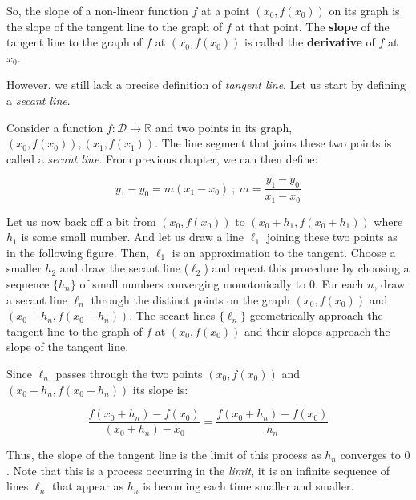 \documentclass[11pt]{article}
\theoremstyle{definition}
\theoremstyle{plain}
\begin{document}
    So, the slope of a non-linear function \(f\) at a point
\(\left(x_0,f(x_0)\right)\) on its graph is the slope of the tangent
line to the graph of \(f\) at that point. The \textbf{slope} of the
tangent line to the graph of \(f\) at \(\left(x_0,f(x_0)\right)\) is
called the \textbf{derivative} of \(f\) at \(x_0\).

However, we still lack a precise definition of \emph{tangent line}. Let
us start by defining a \emph{secant line}.

Consider a function \(f : \mathcal{D}\rightarrow\mathbb{R}\) and two
points in its graph,
\(\left(x_0, f(x_0)\right),\left(x_1, f(x_1)\right)\). The line segment
that joins these two points is called a \emph{secant line}. From
previous chapter, we can then define:

\[
y_1 - y_0 = m(x_1 - x_0) \ ; \  m = \frac{y_1 - y_0}{x_1 - x_0}
\]

Let us now back off a bit from \(\left(x_0, f(x_0)\right)\) to
\(\left(x_0+h_1, f(x_0+h_1)\right)\) where \(h_1\) is some small number.
And let us draw a line \(\ell_1\) joining these two points as in the
following figure. Then, \(\ell_1\) is an approximation to the tangent.
Choose a smaller \(h_2\) and draw the secant line (\(\ell_2\)) and
repeat this procedure by choosing a sequence \(\{h_n\}\) of small
numbers converging monotonically to \(0\). For each \(n\), draw a secant
line \(\ell_n\) through the distinct points on the graph
\(\left(x_0, f(x_0)\right)\) and \(\left(x_0+h_n, f(x_0+h_n)\right)\).
The secant lines \(\{\ell_n\}\) geometrically approach the tangent line
to the graph of \(f\) at \(\left(x_0, f(x_0)\right)\) and their slopes
approach the slope of the tangent line.

Since \(\ell_n\) passes through the two points
\(\left(x_0, f(x_0)\right)\) and \(\left(x_0+h_n, f(x_0+h_n)\right)\)
its slope is:

\[
\frac{f(x_0 + h_n) - f(x_0)}{(x_0+h_n)-x_0} = \frac{f(x_0 + h_n) - f(x_0)}{h_n}
\]

Thus, the slope of the tangent line is the limit of this process as
\(h_n\) converges to \(0\). Note that this is a process occurring in the
\emph{limit}, it is an infinite sequence of lines \(\ell_n\) that appear
as \(h_n\) is becoming each time smaller and smaller.

    \begin{center}
    \end{center}
    { \hspace*{\fill} \\}
\end{document}
